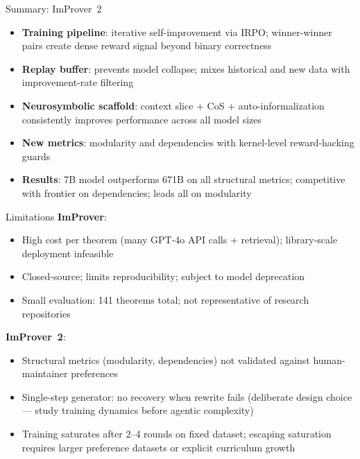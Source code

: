 \begin{frame}{Summary: ImProver~2}
\vspace{0.5em}
\begin{itemize}\setlength{\itemsep}{8pt}
  \item \textbf{Training pipeline}: iterative self-improvement via IRPO; winner-winner pairs create dense reward signal beyond binary correctness
  \item \textbf{Replay buffer}: prevents model collapse; mixes historical and new data with improvement-rate filtering
  \item \textbf{Neurosymbolic scaffold}: context slice + CoS + auto-informalization consistently improves performance across all model sizes
  \item \textbf{New metrics}: modularity and dependencies with kernel-level reward-hacking guards
  \item \textbf{Results}: 7B model outperforms 671B on all structural metrics; competitive with frontier on dependencies; leads all on modularity
\end{itemize}
\end{frame}

\begin{frame}{Limitations}
\vspace{0.3em}
\textbf{ImProver}:
\begin{itemize}\setlength{\itemsep}{4pt}
  \item High cost per theorem (many GPT-4o API calls + retrieval); library-scale deployment infeasible
  \item Closed-source; limits reproducibility; subject to model deprecation
  \item Small evaluation: 141 theorems total; not representative of research repositories
\end{itemize}
\vspace{0.4em}
\textbf{ImProver~2}:
\begin{itemize}\setlength{\itemsep}{4pt}
  \item Structural metrics (modularity, dependencies) not validated against human-maintainer preferences
  \item Single-step generator: no recovery when rewrite fails (deliberate design choice --- study training dynamics before agentic complexity)
  \item Training saturates after 2--4 rounds on fixed dataset; escaping saturation requires larger preference datasets or explicit curriculum growth
\end{itemize}
\end{frame}

